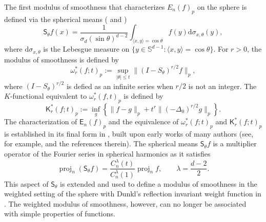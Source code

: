 \documentclass{amsart}
\theoremstyle{remark}
\def\d{\mathrm{d}}
\def\t{{\theta}}
\def\l{{\lambda}}
\def\o{{\omega}}
\def\s{\sigma}
\def\SS{{\mathbb S}}
\def\proj{\operatorname{proj}}
\def\d{\mathrm{d}}
\def\sE{{\mathsf E}}
\def\sK{{\mathsf K}}
\def\sS{{\mathsf S}}
\def\t{{\theta}}
\def\l{{\lambda}}
\def\o{{\omega}}
\def\s{\sigma}
\def\SS{{\mathbb S}}
\def\proj{\operatorname{proj}}
\begin{document}
The first modulus of smoothness that characterizes $E_n(f)_p$ on the sphere is defined via the spherical means
(\cite[p. 216]{BBP} and \cite[p. 475]{P}) %
\begin{equation*} 
 \sS_\theta f(x) = \frac{1}{\s_{d} (\sin \theta)^{d-2}} \int_{\langle x, y\rangle = \cos\theta} f(y) \d\s_{x,\theta}(y),
\end{equation*}
where $\d \s_{x,\theta}$ is the Lebesgue measure on  $\{ y\in \SS^{d-1}: \langle x, y\rangle = \cos\theta\}$. 
For $r > 0$, the modulus of smoothness is defined by
\begin{equation}\label{eq:omega*}
  \o_r^*(f; t)_p := \sup_{|\t| \le t} \| (I - S_\t)^{r/2} f\|_p,
\end{equation} 
where $(I-S_\t)^{ r/2}$ is defied as an infinite series when $ r/2$ is not an integer. The $K$-functional equivalent to 
$\o_r^*(f, t)_p$ is defined by 
\begin{equation}\label{eq:K-func*}
  \sK_r^*(f; t)_p := \inf_g \left\{ \|f-g\|_p + t^r \|(- \Delta_0)^{r/2}g\|_p \right\}.
\end{equation}
The characterization of $\sE_n(f)_p$ and the equivalence of $\o_r^*(f; t)_p$ and  $\sK_r^*(f; t)_p$ is established 
in its final form in \cite{Rus}, built upon early works of many authors (see, for example, \cite{BBP, LN, P, Rus} and 
the references therein). The spherical means $\sS_\theta f$ is a multiplier operator of the Fourier series in 
spherical harmonics as it satisfies
\begin{equation}\label{eq:multiplier_S}
   \proj_n \left(\sS_\theta f \right) = \frac{C_n^{\l}(t)}{C_n^\l(1)} \proj_n f, \qquad \l = \frac{d-2}{2}.
\end{equation}
This aspect of $\sS_\t$ is extended and used to define a modulus of smoothness in the weighted setting 
of the sphere with Dunkl's reflection invariant weight function in \cite{X05}. The weighted modulus of smoothness, 
however, can no longer be associated with simple properties of functions. 
\end{document}
